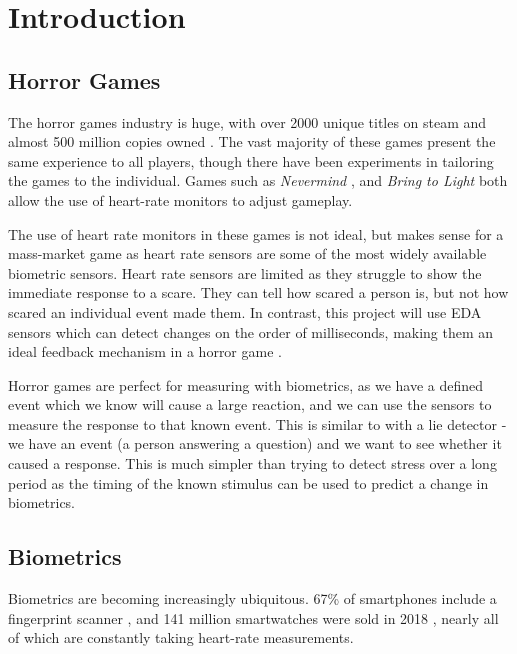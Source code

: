 \documentclass[12pt,a4paper]{article}
\begin{document}
\section{Introduction}


\subsection{Horror Games}
The horror games industry is huge, with over 2000 unique titles on steam and almost 500 million copies owned \cite{horrorSteamSpy}. The vast majority of these games present the same experience to all players, though there have been experiments in tailoring the games to the individual. Games such as  \emph{Nevermind} \cite{nevermind}, and \emph{Bring to Light} \cite{bringtolight} both allow the use of heart-rate monitors to adjust gameplay.

The use of heart rate monitors in these games is not ideal, but makes sense for a mass-market game as heart rate sensors are some of the most widely available biometric sensors. Heart rate sensors are limited as they struggle to show the immediate response to a scare. They can tell how scared a person is, but not how scared an individual event made them. In contrast, this project will use EDA sensors which can detect changes on the order of milliseconds, making them an ideal feedback mechanism in a horror game \cite{edaAnalysis}.

Horror games are perfect for measuring with biometrics, as we have a defined event which we know will cause a large reaction, and we can use the sensors to measure the response to that known event. This is similar to with a lie detector - we have an event (a person answering a question) and we want to see whether it caused a response. This is much simpler than trying to detect stress over a long period as the timing of the known stimulus can be used to predict a change in biometrics.

\subsection{Biometrics}
Biometrics are becoming increasingly ubiquitous. 67\% of smartphones include a fingerprint scanner \cite{fingerprint}, and 141 million smartwatches were sold in 2018 \cite{smartwatches}, nearly all of which are constantly taking heart-rate measurements.
\end{document}
